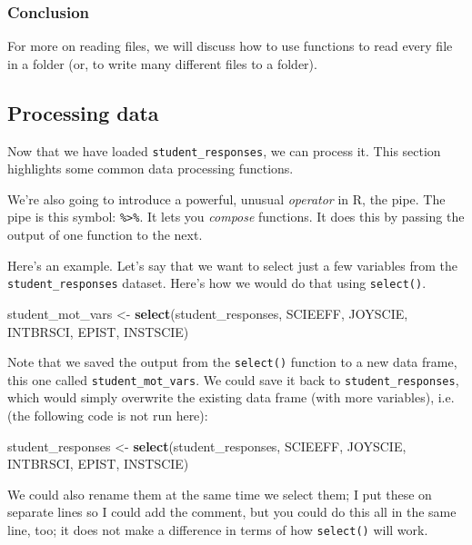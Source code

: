 \documentclass[]{article}
\newenvironment{Shaded}{\begin{snugshade}}{\end{snugshade}}
\newcommand{\KeywordTok}[1]{\textcolor[rgb]{0.13,0.29,0.53}{\textbf{#1}}}
\newcommand{\StringTok}[1]{\textcolor[rgb]{0.31,0.60,0.02}{#1}}
\newcommand{\NormalTok}[1]{#1}
\begin{document}
\subsubsection{Conclusion}\label{conclusion}

For more on reading files, we will discuss how to use functions to read
every file in a folder (or, to write many different files to a folder).

\subsection{Processing data}\label{processing-data}

Now that we have loaded \texttt{student\_responses}, we can process it.
This section highlights some common data processing functions.

We're also going to introduce a powerful, unusual \emph{operator} in R,
the pipe. The pipe is this symbol: \texttt{\%\textgreater{}\%}. It lets
you \emph{compose} functions. It does this by passing the output of one
function to the next.

Here's an example. Let's say that we want to select just a few variables
from the \texttt{student\_responses} dataset. Here's how we would do
that using \texttt{select()}.

\begin{Shaded}
\begin{Highlighting}[]
\NormalTok{student_mot_vars <-}\StringTok{ }\KeywordTok{select}\NormalTok{(student_responses, SCIEEFF, JOYSCIE, INTBRSCI, EPIST, INSTSCIE)}
\end{Highlighting}
\end{Shaded}

Note that we saved the output from the \texttt{select()} function to a
new data frame, this one called \texttt{student\_mot\_vars}. We could
save it back to \texttt{student\_responses}, which would simply
overwrite the existing data frame (with more variables), i.e. (the
following code is not run here):

\begin{Shaded}
\begin{Highlighting}[]
\NormalTok{student_responses <-}\StringTok{ }\KeywordTok{select}\NormalTok{(student_responses, SCIEEFF, JOYSCIE, INTBRSCI, EPIST, INSTSCIE)}
\end{Highlighting}
\end{Shaded}

We could also rename them at the same time we select them; I put these
on separate lines so I could add the comment, but you could do this all
in the same line, too; it does not make a difference in terms of how
\texttt{select()} will work.
\end{document}
